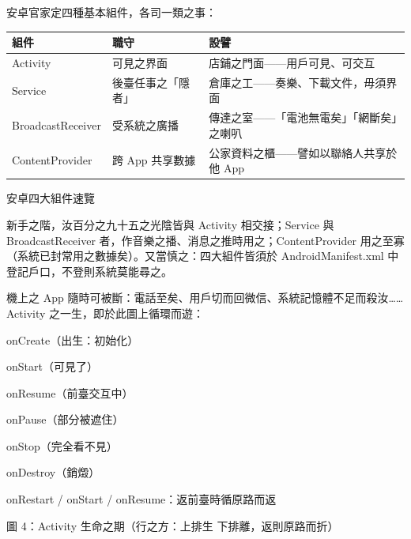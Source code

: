 


安卓官家定四種基本組件，各司一類之事：

\begin{center}
\begin{tabularx}{\linewidth}{|X|X|X|}
\hline
\textbf{組件} & \textbf{職守} & \textbf{設譬} \tabularnewline
\hline
Activity & 可見之界面 & 店鋪之門面——用戶可見、可交互 \tabularnewline
Service & 後臺任事之「隱者」 & 倉庫之工——奏樂、下載文件，毋須界面 \tabularnewline
BroadcastReceiver & 受系統之廣播 & 傳達之室——「電池無電矣」「網斷矣」之喇叭 \tabularnewline
ContentProvider & 跨 App 共享數據 & 公家資料之櫃——譬如以聯絡人共享於他 App \tabularnewline
\hline
\end{tabularx}
\end{center}

\begin{center}\small\color{gray}安卓四大組件速覽\end{center}

新手之階，汝百分之九十五之光陰皆與 Activity 相交接；Service 與 BroadcastReceiver 者，作音樂之播、消息之推時用之；ContentProvider 用之至寡（系統已封常用之數據矣）。又當慎之：四大組件皆須於 AndroidManifest.xml 中登記戶口，不登則系統莫能尋之。


機上之 App 隨時可被斷：電話至矣、用戶切而回微信、系統記憶體不足而殺汝……Activity 之一生，即於此圖上循環而遊：

onCreate（出生：初始化）

onStart（可見了）

onResume（前臺交互中）

onPause（部分被遮住）

onStop（完全看不見）

onDestroy（銷燬）

onRestart / onStart / onResume：返前臺時循原路而返

\begin{center}\small\color{gray}圖 4：Activity 生命之期（行之方：上排生 下排離，返則原路而折）\end{center}


